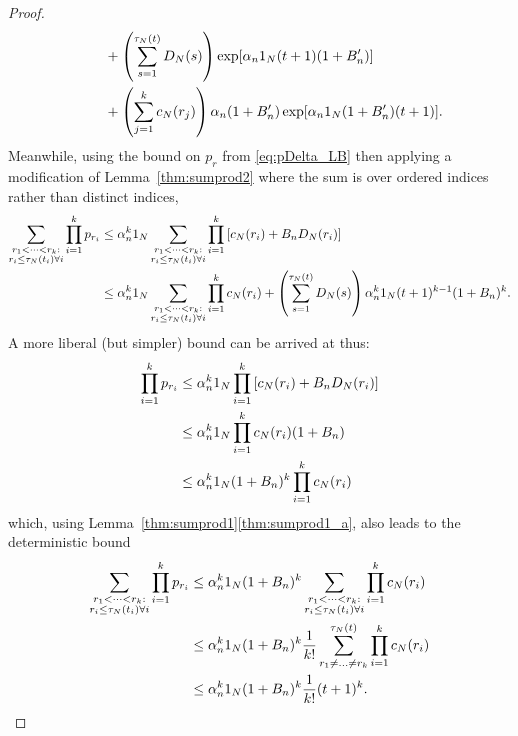 \begin{proof}
\begin{align}
    &\qquad+ \left( \sum_{s=1}^{\tau_N(t)} D_N(s) \right)
        \exp[ \alpha_n 1_N (t+1) (1+B_n^\prime) ] \notag\\
    &\qquad+ \left( \sum_{j=1}^k c_N(r_j) \right)
        \alpha_n (1 + B_n^\prime)
        \exp[ \alpha_n 1_N (1 + B_n^\prime) (t+1) ] . \label{eq:034b}
\end{align}
Meanwhile, using the bound on $p_r$ from \eqref{eq:pDelta_LB} then applying a modification of Lemma~\ref{thm:sumprod2} where the sum is over ordered indices rather than distinct indices,
\begin{align}
\sum_{\substack{r_1 <\dots< r_k :\\ r_i \leq \tau_N(t_i) \forall i}}
        \prod_{i=1}^k p_{r_i}
&\leq \alpha_n^k 1_N 
        \sum_{\substack{r_1 <\dots< r_k :\\ r_i \leq \tau_N(t_i) \forall i}}
        \prod_{i=1}^k \left[ c_N(r_i) + B_n D_N(r_i) \right] \notag\\
&\leq \alpha_n^k 1_N
        \sum_{\substack{r_1 <\dots< r_k :\\ r_i \leq \tau_N(t_i) \forall i}}
        \prod_{i=1}^k c_N(r_i)
        + \left( \sum_{s=1}^{\tau_N(t)} D_N(s) \right)
        \alpha_n^k 1_N (t+1)^{k-1} (1+B_n)^k . \label{eq:035}
\end{align}
A more liberal (but simpler) bound can be arrived at thus:
\begin{align*}
\prod_{i=1}^k p_{r_i}
&\leq \alpha_n^k 1_N 
        \prod_{i=1}^k \left[ c_N(r_i) + B_n D_N(r_i) \right] \\
&\leq \alpha_n^k 1_N 
        \prod_{i=1}^k c_N(r_i) (1 + B_n) \\
&\leq \alpha_n^k 1_N (1 + B_n)^k
        \prod_{i=1}^k c_N(r_i) 
\end{align*}
which, using Lemma~\ref{thm:sumprod1}\ref{thm:sumprod1_a}, also leads to the deterministic bound
\begin{align}
\sum_{\substack{r_1 <\dots< r_k :\\ r_i \leq \tau_N(t_i) \forall i}}
        \prod_{i=1}^k p_{r_i}
&\leq \alpha_n^k 1_N (1 + B_n)^k
        \sum_{\substack{r_1 <\dots< r_k :\\ r_i \leq \tau_N(t_i) \forall i}}
        \prod_{i=1}^k c_N(r_i) \notag\\
&\leq \alpha_n^k 1_N (1 + B_n)^k \frac{1}{k!}
        \sum_{r_1 \neq \dots\neq r_k}^{\tau_N(t)} 
        \prod_{i=1}^k c_N(r_i) \notag\\
&\leq \alpha_n^k 1_N (1 + B_n)^k \frac{1}{k!} (t+1)^k. 
        \label{eq:037}
\end{align}

\end{proof}
